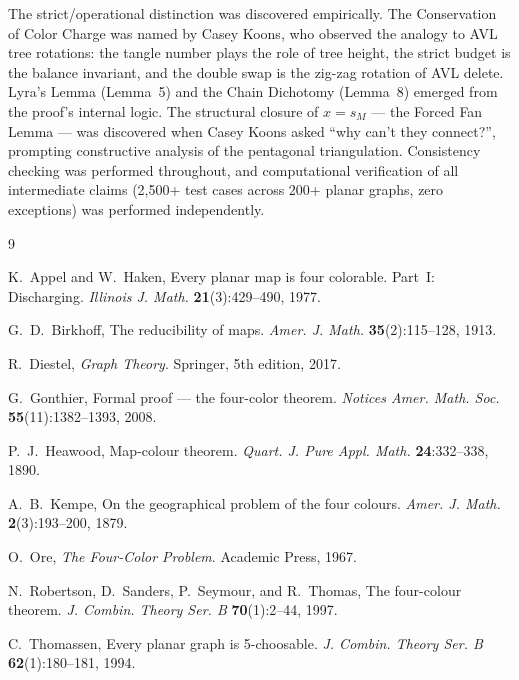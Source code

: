 \documentclass[11pt]{article}
\theoremstyle{remark}
\begin{document}
The strict/operational distinction was discovered empirically. The Conservation of Color Charge was named by Casey Koons, who observed the analogy to AVL tree rotations: the tangle number plays the role of tree height, the strict budget is the balance invariant, and the double swap is the zig-zag rotation of AVL delete. Lyra's Lemma (Lemma~5) and the Chain Dichotomy (Lemma~8) emerged from the proof's internal logic. The structural closure of $x = s_M$ --- the Forced Fan Lemma --- was discovered when Casey Koons asked ``why can't they connect?'', prompting constructive analysis of the pentagonal triangulation. Consistency checking was performed throughout, and computational verification of all intermediate claims (2,500+ test cases across 200+ planar graphs, zero exceptions) was performed independently.

\begin{thebibliography}{9}

K.~Appel and W.~Haken,
Every planar map is four colorable. Part~I: Discharging.
\textit{Illinois J. Math.} \textbf{21}(3):429--490, 1977.

G.~D.~Birkhoff,
The reducibility of maps.
\textit{Amer. J. Math.} \textbf{35}(2):115--128, 1913.

R.~Diestel,
\textit{Graph Theory}.
Springer, 5th edition, 2017.

G.~Gonthier,
Formal proof --- the four-color theorem.
\textit{Notices Amer. Math. Soc.} \textbf{55}(11):1382--1393, 2008.

P.~J.~Heawood,
Map-colour theorem.
\textit{Quart. J. Pure Appl. Math.} \textbf{24}:332--338, 1890.

A.~B.~Kempe,
On the geographical problem of the four colours.
\textit{Amer. J. Math.} \textbf{2}(3):193--200, 1879.

O.~Ore,
\textit{The Four-Color Problem}.
Academic Press, 1967.

N.~Robertson, D.~Sanders, P.~Seymour, and R.~Thomas,
The four-colour theorem.
\textit{J. Combin. Theory Ser. B} \textbf{70}(1):2--44, 1997.

C.~Thomassen,
Every planar graph is 5-choosable.
\textit{J. Combin. Theory Ser. B} \textbf{62}(1):180--181, 1994.

\end{thebibliography}
\end{document}
